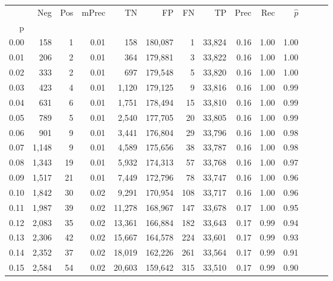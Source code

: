 \begin{tabular}{rrrrrrrrrrrrrr}
\toprule
{} &    Neg &  Pos & mPrec &       TN &       FP &      FN &      TP &  Prec &   Rec & $\hat{p}$ \\
p    &        &      &       &          &          &         &         &       &       &           \\
\midrule
0.00 &    158 &    1 &  0.01 &      158 &  180,087 &       1 &  33,824 &  0.16 &  1.00 &      1.00 \\
0.01 &    206 &    2 &  0.01 &      364 &  179,881 &       3 &  33,822 &  0.16 &  1.00 &      1.00 \\
0.02 &    333 &    2 &  0.01 &      697 &  179,548 &       5 &  33,820 &  0.16 &  1.00 &      1.00 \\
0.03 &    423 &    4 &  0.01 &    1,120 &  179,125 &       9 &  33,816 &  0.16 &  1.00 &      0.99 \\
0.04 &    631 &    6 &  0.01 &    1,751 &  178,494 &      15 &  33,810 &  0.16 &  1.00 &      0.99 \\
0.05 &    789 &    5 &  0.01 &    2,540 &  177,705 &      20 &  33,805 &  0.16 &  1.00 &      0.99 \\
0.06 &    901 &    9 &  0.01 &    3,441 &  176,804 &      29 &  33,796 &  0.16 &  1.00 &      0.98 \\
0.07 &  1,148 &    9 &  0.01 &    4,589 &  175,656 &      38 &  33,787 &  0.16 &  1.00 &      0.98 \\
0.08 &  1,343 &   19 &  0.01 &    5,932 &  174,313 &      57 &  33,768 &  0.16 &  1.00 &      0.97 \\
0.09 &  1,517 &   21 &  0.01 &    7,449 &  172,796 &      78 &  33,747 &  0.16 &  1.00 &      0.96 \\
0.10 &  1,842 &   30 &  0.02 &    9,291 &  170,954 &     108 &  33,717 &  0.16 &  1.00 &      0.96 \\
0.11 &  1,987 &   39 &  0.02 &   11,278 &  168,967 &     147 &  33,678 &  0.17 &  1.00 &      0.95 \\
0.12 &  2,083 &   35 &  0.02 &   13,361 &  166,884 &     182 &  33,643 &  0.17 &  0.99 &      0.94 \\
0.13 &  2,306 &   42 &  0.02 &   15,667 &  164,578 &     224 &  33,601 &  0.17 &  0.99 &      0.93 \\
0.14 &  2,352 &   37 &  0.02 &   18,019 &  162,226 &     261 &  33,564 &  0.17 &  0.99 &      0.91 \\
0.15 &  2,584 &   54 &  0.02 &   20,603 &  159,642 &     315 &  33,510 &  0.17 &  0.99 &      0.90 \\

\end{tabular}
